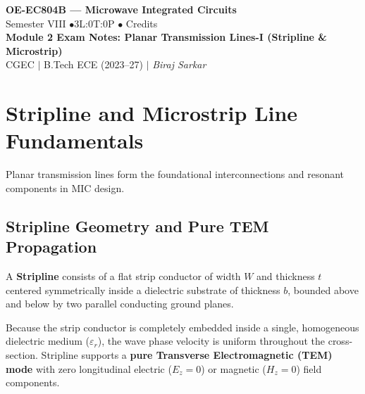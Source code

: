 \documentclass[10pt,a4paper]{article}
\begin{document}
\begin{center}
  {\LARGE\bfseries\color{myred} OE-EC804B --- Microwave Integrated Circuits}\\[5pt]
  {\normalsize\color{mydark} Semester VIII \quad$\bullet$\quad 3L:0T:0P \quad$\bullet$ Credits}\\[3pt]
  {\normalsize\color{myteal}\textbf{Module 2 Exam Notes: Planar Transmission Lines-I (Stripline \& Microstrip)}}\\[3pt]
  {\small\color{mydark} CGEC \;$|$\; B.Tech ECE (2023--27) \;$|$\; \textit{Biraj Sarkar}}
\end{center}
\vspace{2pt}
\noindent{\color{myred}\rule{\linewidth}{1.5pt}}
\vspace{2pt}

\hypersetup{linkcolor=mydark}
\tableofcontents
\hypersetup{linkcolor=myteal}
\newpage

\section{Stripline and Microstrip Line Fundamentals}

Planar transmission lines form the foundational interconnections and resonant components in MIC design.

\subsection{Stripline Geometry and Pure TEM Propagation}
A \textbf{Stripline} consists of a flat strip conductor of width $W$ and thickness $t$ centered symmetrically inside a dielectric substrate of thickness $b$, bounded above and below by two parallel conducting ground planes.

\begin{tcolorbox}[defbox, title={Stripline Pure TEM Propagation}]
  Because the strip conductor is completely embedded inside a single, homogeneous dielectric medium ($\varepsilon_r$), the wave phase velocity is uniform throughout the cross-section. Stripline supports a \textbf{pure Transverse Electromagnetic (TEM) mode} with zero longitudinal electric ($E_z = 0$) or magnetic ($H_z = 0$) field components.
\end{tcolorbox}
\end{document}
